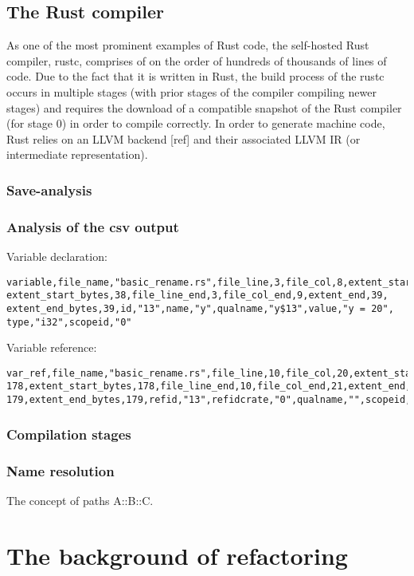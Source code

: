 \subsection{The Rust compiler}
As one of the most prominent examples of Rust code, the self-hosted Rust compiler, rustc, comprises of on the order of hundreds of thousands of lines of code. Due to the fact that it is written in Rust, the build process of the rustc occurs in multiple stages (with prior stages of the compiler compiling newer stages) and requires the download of a compatible snapshot of the Rust compiler (for stage 0) in order to compile correctly. In order to generate machine code, Rust relies on an LLVM backend [ref] and their associated LLVM IR (or intermediate representation).

\subsubsection{Save-analysis}

\subsubsection{Analysis of the csv output}

Variable declaration:
\begin{verbatim}
variable,file_name,"basic_rename.rs",file_line,3,file_col,8,extent_start,38,
extent_start_bytes,38,file_line_end,3,file_col_end,9,extent_end,39,
extent_end_bytes,39,id,"13",name,"y",qualname,"y$13",value,"y = 20",
type,"i32",scopeid,"0"
\end{verbatim}

\noindent
Variable reference:
\begin{verbatim}
var_ref,file_name,"basic_rename.rs",file_line,10,file_col,20,extent_start,
178,extent_start_bytes,178,file_line_end,10,file_col_end,21,extent_end,
179,extent_end_bytes,179,refid,"13",refidcrate,"0",qualname,"",scopeid,"4"
\end{verbatim}

\subsubsection{Compilation stages}

\subsubsection{Name resolution}
The concept of paths A::B::C.

\section{The background of refactoring}

